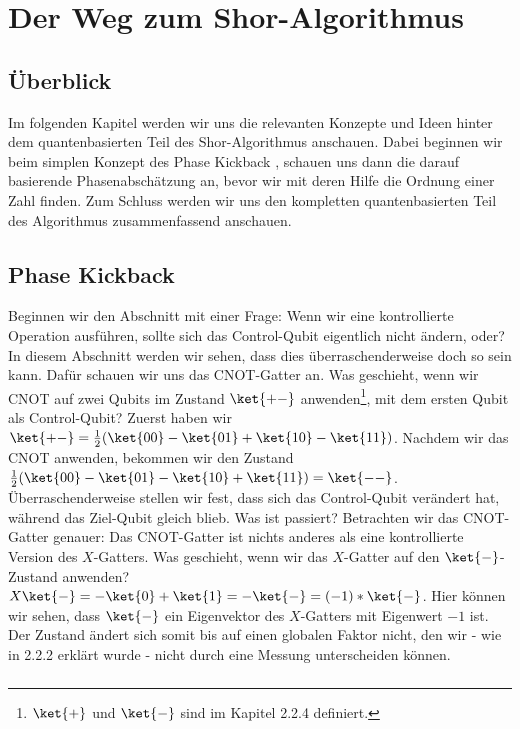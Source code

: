 \chapter{Der Weg zum Shor-Algorithmus}
\section{Überblick}
Im folgenden Kapitel werden wir uns die relevanten Konzepte und Ideen hinter dem quantenbasierten Teil des Shor-Algorithmus anschauen. Dabei beginnen wir beim simplen Konzept des \grqq Phase Kickback\grqq{} , schauen uns dann die darauf basierende Phasenabschätzung an, bevor wir mit deren Hilfe die Ordnung einer Zahl finden. Zum Schluss werden wir uns den kompletten quantenbasierten Teil des Algorithmus zusammenfassend anschauen.
\section{Phase Kickback}
Beginnen wir den Abschnitt mit einer Frage: Wenn wir eine kontrollierte Operation ausführen, sollte sich das Control-Qubit eigentlich nicht ändern, oder? In diesem Abschnitt werden wir sehen, dass dies überraschenderweise doch so sein kann. Dafür schauen wir uns das CNOT-Gatter an. Was geschieht, wenn wir CNOT auf zwei Qubits im Zustand $\ket{+-}$ anwenden\footnote{$\ket{+}$ und $\ket{-}$ sind im Kapitel 2.2.4 definiert.}, mit dem ersten Qubit als Control-Qubit? Zuerst haben wir $\ket{+-} = \frac{1}{2}(\ket{00} - \ket{01} + \ket{10} - \ket{11})$. Nachdem wir das CNOT anwenden, bekommen wir den Zustand $\frac{1}{2}(\ket{00} - \ket{01} - \ket{10} + \ket{11}) = \ket{--}$. Überraschenderweise stellen wir fest, dass sich das Control-Qubit verändert hat, während das Ziel-Qubit gleich blieb. Was ist passiert? Betrachten wir das CNOT-Gatter genauer: Das CNOT-Gatter ist nichts anderes als eine kontrollierte Version des $X$-Gatters. Was geschieht, wenn wir das $X$-Gatter auf den $\ket{-}$-Zustand anwenden? $X\ket{-} = -\ket{0} + \ket{1} = -\ket{-} = (-1)*\ket{-}$. Hier können wir sehen, dass $\ket{-}$ ein Eigenvektor des $X$-Gatters mit Eigenwert $-1$ ist. Der Zustand ändert sich somit bis auf einen globalen Faktor nicht, den wir - wie in 2.2.2 erklärt wurde - nicht durch eine Messung unterscheiden können.

\paragraph{}

